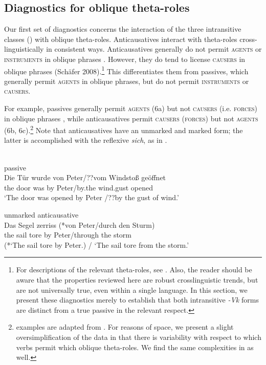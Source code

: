 \documentclass[output=paper]{langsci/lanmgscibook}
\begin{document}
\subsection{Diagnostics for oblique theta-roles} %

Our first set of diagnostics concerns the interaction of the three intransitive classes () with oblique theta-roles. Anticausatives interact with theta-roles cross-linguistically in consistent ways. Anticausatives generally do not permit \textsc{agents} or \textsc{instruments} in oblique phrases \citep{Levin1995}. However, they do tend to license \textsc{causers} in oblique phrases (Schäfer 2008).\footnote{For descriptions of the relevant theta-roles, see \citet{Levin1995}. Also, the reader should be aware that the properties reviewed here are robust crosslinguistic trends, but are not universally true, even within a single language. In this section, we present these diagnostics merely to establish that both intransitive \textit{-Vk} forms are distinct from a true passive in the relevant respect.} This differentiates them from passives, which generally permit \textsc{agents} in oblique phrases, but do not permit \textsc{instruments} or \textsc{causers}.

For example,  passives generally permit \textsc{agents (6}a) but not \textsc{causers (}i.e. \textsc{forces}) in oblique phrases , while  anticausatives permit \textsc{causers} (\textsc{forces}) but not \textsc{agents} (6b, 6c).\footnote{{}  examples are adapted from \citet{Schäfer2008}. For reasons of space, we present a slight oversimplification of the data in that there is variability with respect to which verbs permit which oblique theta-roles. We find the same complexities in  as well.}\textsuperscript{}  Note that  anticausatives have an unmarked and marked form; the latter is accomplished with the reflexive \textit{sich}, as in .

\ea\label{ex:gluckman:6} 
\\
\ea\label{ex:gluckman:6a}
{{passive}}\\
\gll   Die Tür wurde von Peter/??vom      Windstoß  geöffnet\\
       the door was    by   Peter/by.the  wind.gust   opened\\
\glt ‘The door was opened by Peter /??by the gust of wind.’

\ex\label{ex:gluckman:6b}
{{unmarked anticausative}}\\
\gll   Das Segel zerriss (*von Peter/durch den Sturm)\\
       the  sail    tore        by    Peter/through the storm\\
\glt (*‘The sail tore by Peter.) / ‘The sail tore from the storm.’
\end{document}
